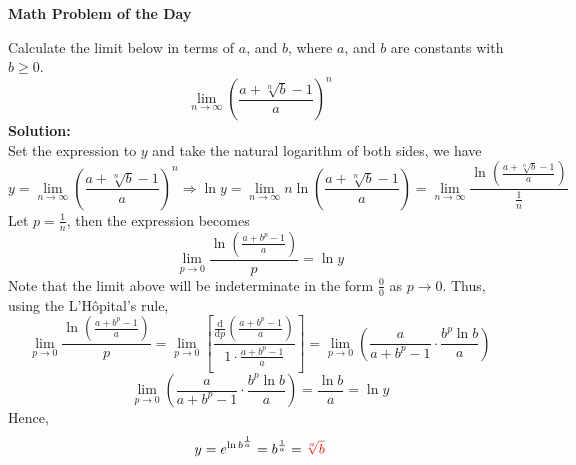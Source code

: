 \documentclass[14pt]{extreport}
\begin{document}
	\setlength{\columnsep}{20pt}
	\renewcommand{\arraystretch}{1.5}
	\singlespacing
	
	\noindent
	\begin{center}
		{\large  \textbf{Math Problem of the Day}} \\ 
	\end{center}
	
		\noindent
		Calculate the limit below in terms of $a$, and $b$, where $a$, and $b$ are constants with $b \geq 0$.
		\[ \lim_{n \to \infty} {\left( \frac{a + \sqrt[n]{b} - 1}{a}  \right)}^n  \]
	\bigskip
	\noindent
	\textbf{Solution:} \\
		Set the expression to $y$ and take the natural logarithm of both sides, we have
		\[ y = \lim_{n \to \infty} {\left( \frac{a + \sqrt[n]{b} - 1}{a}  \right)}^n  \Rightarrow
 		\ln y = \lim_{n \to \infty} n \ln \left( \frac{a + \sqrt[n]{b} - 1}{a}  \right)
 		=  \lim_{n \to \infty} \frac{ \ln \left( \frac{a + \sqrt[n]{b} - 1}{a}  \right)}{\frac{1}{n}} \]
		Let $ p = \frac{1}{n}  $, then the expression becomes
		\[  \lim_{p \to 0} \frac{ \ln \left( \frac{a + b^p - 1}{a}  \right)}{p} = \ln y \]
		Note that the limit above will be indeterminate in the form $\frac{0}{0}$ as $ p \to 0  $. Thus, using the L'Hôpital's rule,
		\[  \lim_{p \to 0} \frac{ \ln \left( \frac{a + b^p - 1}{a}  \right)}{p} =  \lim_{ p \to 0 } \left[ \frac{  \frac{\mathrm{d}}{\mathrm{d}p} \left( \frac{a + b^p - 1}{a} \right)  }{1 \cdot \frac{a + b^p - 1}{a}} \right] = \lim_{ p \to 0} \left( \frac{a}{a+b^p-1} \cdot \frac{b^p \ln b}{a} \right) \]
		\[ \lim_{ p \to 0} \left( \frac{a}{a+b^p-1} \cdot \frac{b^p \ln b}{a} \right) = \frac{\ln b}{a} = \ln y \]
		Hence,
		\[ y = e^{\ln b^{\frac{1}{a}}} = b^{\frac{1}{a}} =\textcolor{red}{\sqrt[a]{b}}  \]
\end{document}
